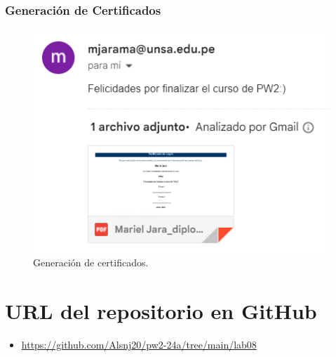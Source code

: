 \documentclass{article}
\begin{document}
\subsubsection{Generación de Certificados}
\begin{figure}[H]
	\centering
	\begin{minipage}{0.6\textwidth}
		\centering
		\includegraphics[width=\linewidth,keepaspectratio]{img/certificado.png}
		\caption{Generación de certificados.}
	\end{minipage}
\end{figure}
\section{URL del repositorio en GitHub}
\begin{itemize}
	\item \url{https://github.com/Alsnj20/pw2-24a/tree/main/lab08}
\end{itemize}
\pagebreak
\end{document}
